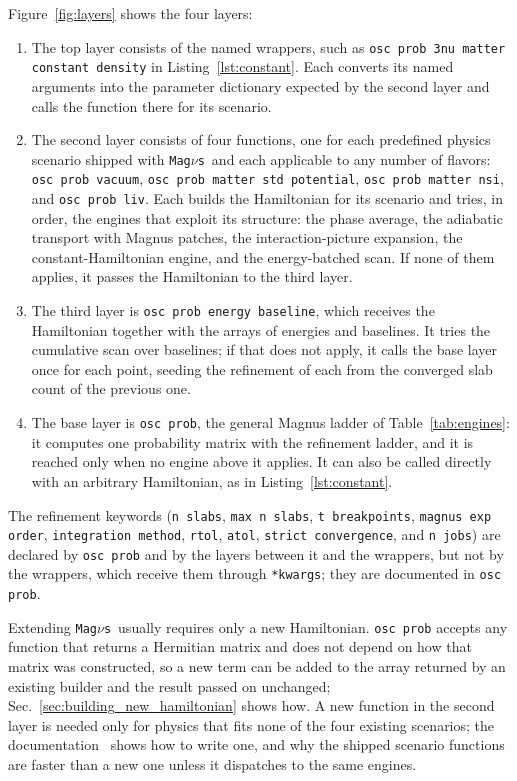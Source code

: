 \documentclass[final,5p,times,twocolumn,sort,compress]{elsarticle}
\makeatletter
\DeclareRobustCommand{\_}{%
  \ifmmode\nfss@text{\textunderscore}\else\textunderscore\allowbreak\fi}
\newcommand{\us}{\_}
\newcommand{\magnus}{{\tt Mag}\ensuremath{\nu}{\tt s}}
\makeatother
\begin{document}
Figure~\ref{fig:layers} shows the four layers:
\begin{enumerate}
\item The top layer consists of the named wrappers, such as {\tt osc\_prob\_3nu\_matter\_constant\_density} in Listing~\ref{lst:constant}. Each converts its named arguments into the parameter dictionary expected by the second layer and calls the function there for its scenario.
\smallskip
\item The second layer consists of four functions, one for each predefined physics scenario shipped with \magnus\ and each applicable to any number of flavors: {\tt osc\_prob\_vacuum}, {\tt osc\us prob\us matter\us std\us potential}, {\tt osc\_prob\_matter\_nsi}, and {\tt osc\_prob\_liv}. Each builds the Hamiltonian for its scenario and tries, in order, the engines that exploit its structure: the phase average, the adiabatic transport with Magnus patches, the interaction-picture expansion, the constant-Hamiltonian engine, and the energy-batched scan. If none of them applies, it passes the Hamiltonian to the third layer.
\smallskip
\item The third layer is {\tt osc\us prob\us energy\us baseline}, which receives the Hamiltonian together with the arrays of energies and baselines. It tries the cumulative scan over baselines; if that does not apply, it calls the base layer once for each point, seeding the refinement of each from the converged slab count of the previous one.
\smallskip
\item The base layer is {\tt osc\_prob}, the general Magnus ladder of Table~\ref{tab:engines}: it computes one probability matrix with the refinement ladder, and it is reached only when no engine above it applies. It can also be called directly with an arbitrary Hamiltonian, as in Listing~\ref{lst:constant}.
\end{enumerate}

The refinement keywords ({\tt n\_slabs}, {\tt max\us n\us slabs}, {\tt t\_breakpoints}, {\tt magnus\_exp\_order}, {\tt integration\us method}, {\tt rtol}, {\tt atol}, {\tt strict\_convergence}, and {\tt n\_jobs}) are declared by {\tt osc\_prob} and by the layers between it and the wrappers, but not by the wrappers, which receive them through {\tt **kwargs}; they are documented in {\tt osc\_prob}.

Extending \magnus\ usually requires only a new Hamiltonian. {\tt osc\_prob} accepts any function that returns a Hermitian matrix and does not depend on how that matrix was constructed, so a new term can be added to the array returned by an existing builder and the result passed on unchanged; Sec.~\ref{sec:building_new_hamiltonian} shows how. A new function in the second layer is needed only for physics that fits none of the four existing scenarios; the documentation\ \cite{MagnusDocs} shows how to write one, and why the shipped scenario functions are faster than a new one unless it dispatches to the same engines.
\end{document}
